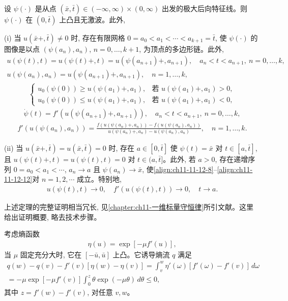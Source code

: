 \documentclass[../../main.tex]{subfiles}
\begin{document}
\begin{theorem}\label{theorem:ch11-11-12-2}
设 $\psi(\cdot)$ 是从点 $(\bar x,\bar t)\in(-\infty,\infty)\times(0,\infty)$ 出发的极大后向特征线。则 $\psi(\cdot)$ 在 $(0,\bar t)$ 上凸且无激波。此外,

(i) 当 $u(\bar x+,\bar t)\neq0$ 时, 存在有限网格 $0=a_0<a_1<\cdots<a_{k+1}=\bar t$, 使 $\psi(\cdot)$ 的图像是以点 $(\psi(a_n),a_n)$, $n=0,\ldots,k+1$, 为顶点的多边形链。此外,
\begin{align}
u(\psi(t),t)=u(\psi(t)+,t)=u(\psi(a_{n+1})+,a_{n+1}),\quad a_n<t<a_{n+1},\ n=0,\ldots,k,\label{align:ch11-11-12-8}\\
u(\psi(a_n),a_n)=u(\psi(a_{n+1})+,a_{n+1}),\quad n=1,\ldots,k,\label{align:ch11-11-12-9}
\end{align}
\begin{align}
\begin{cases}
u_0(\psi(0))\geqslant u(\psi(a_1)+,a_1), & \text{若 }u(\psi(a_1)+,a_1)>0,\\
u_0(\psi(0))\leqslant u(\psi(a_1)+,a_1), & \text{若 }u(\psi(a_1)+,a_1)<0,
\end{cases}\label{align:ch11-11-12-10}
\end{align}
\begin{align}
\dot{\psi}(t)=f'(u(\psi(a_{n+1})+,a_{n+1})),\quad a_n<t<a_{n+1},\ n=0,\ldots,k,\label{align:ch11-11-12-11}
\end{align}
\begin{align}
f'(u(\psi(a_n),a_n))=\frac{f(u(\psi(a_n)+,a_n))-f(u(\psi(a_n),a_n))}{u(\psi(a_n)+,a_n)-u(\psi(a_n),a_n)},\quad n=1,\ldots,k.\label{align:ch11-11-12-12}
\end{align}

(ii) 当 $u(\bar x+,\bar t)=u(\bar x,\bar t)=0$ 时, 存在 $a\in[0,\bar t]$ 使 $\psi(t)=\bar x$ 对 $t\in[a,\bar t]$, 且 $u(\psi(t)+,t)=u(\psi(t),t)=0$ 对 $t\in(a,\bar t]$。此外, 若 $a>0$, 存在递增序列 $0=a_0<a_1<\cdots$, $a_n\to a$ 且 $\psi(a_n)\to\bar x$, 使\eqref{align:ch11-11-12-8}--\eqref{align:ch11-11-12-12}对 $n=1,2,\cdots$ 成立。特别地,
\begin{align}
u(\psi(t),t)\to0,\quad f'(u(\psi(t),t))\to0,\quad t\to a.\label{align:ch11-11-12-13}
\end{align}
\end{theorem}

上述定理的完整证明相当冗长, 见\cref{chapter:ch11-一维标量守恒律}所引文献。这里给出证明概要, 略去技术步骤。


考虑熵函数
\begin{align}
\eta(u)=\exp[-\mu f'(u)],\label{align:ch11-11-12-14}
\end{align}
当 $\mu$ 固定充分大时, 它在 $[-\bar u,\bar u]$ 上凸。它诱导熵流 $q$ 满足
\begin{align}
q(w)-q(v)-f'(v)[\eta(w)-\eta(v)]=\int_v^w\eta'(\omega)[f'(\omega)-f'(v)]\,d\omega\nonumber\\
=-\mu\exp[-\mu f'(v)]\int_0^z\theta\exp(-\mu\theta)\,d\theta\leqslant0,\label{align:ch11-11-12-15}
\end{align}
其中 $z=f'(w)-f'(v)$, 对任意 $v,w$。
\end{document}

